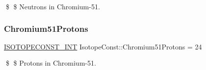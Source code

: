 \$ \$ Neutrons in Chromium-\/51. \mbox{\label{group___isotope_const-_chromium-_cr51_ga99c3dd09c6b8cde3c1da877188fd39d9}} 
\subsubsection{\texorpdfstring{Chromium51\+Protons}{Chromium51Protons}}
{\footnotesize\ttfamily \mbox{\hyperlink{group___isotope_const-_macros_ga5f18360b3e99483a35c32d789e62621c}{I\+S\+O\+T\+O\+P\+E\+C\+O\+N\+S\+T\+\_\+\+I\+NT}} Isotope\+Const\+::\+Chromium51\+Protons = 24}

\$ \$ Protons in Chromium-\/51. 